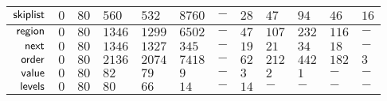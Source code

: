 {\begin{tabular}{ |r||T|T|T||T|T|T|T|T|T|T|T||}
		$\mathsf{skiplist}$			& $0$ & $80$ &$560$ &$532$ &$8760$& $-$ & $28$ & $47$  &  $94$ &$46$ &$16$ \\ \hline
		$\mathsf{region}$			& $0$ & $80$ &$1346$&$1299$&$6502$& $-$ & $47$ & $107$ & $232$ &$116$& $-$ \\ \hline
		$\mathsf{next}$				& $0$ & $80$ &$1346$&$1327$& $345$& $-$ & $19$ &  $21$ &  $34$ & $18$& $-$ \\ \hline
		$\mathsf{order}$				& $0$ & $80$ &$2136$&$2074$&$7418$& $-$ & $62$ & $212$ & $442$ &$182$& $3$ \\ \hline
		$\mathsf{value}$				& $0$ & $80$ & $82$ & $79$ &  $9$ & $-$ &  $3$ &   $2$ &   $1$ & $-$ & $-$ \\ \hline
		$\mathsf{levels}$			& $0$ & $80$ & $80$ & $66$ & $14$ & $-$ & $14$ &   $-$ &   $-$ & $-$ & $-$ \\ \hline
	\end{tabular}
}


